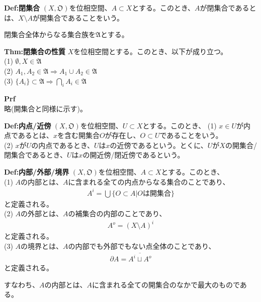 \documentclass[a4paper,11pt]{jsarticle}
\numberwithin{equation}{section}
\begin{document}
\begin{itembox}[l]{\textbf{Def:閉集合}}
  $(X,\mathfrak{O})$を位相空間、$A \subset X$とする。このとき、$A$が閉集合であるとは、$X \setminus A$が開集合であることをいう。
\end{itembox}

閉集合全体からなる集合族を$\mathfrak{A}$とする。
\begin{itembox}[l]{\textbf{Thm:閉集合の性質}}
  $X$を位相空間とする。このとき、以下が成り立つ。\\
  (1) $\emptyset, X \in \mathfrak{A}$\\
  (2) $A_1,A_2 \in \mathfrak{A} \Rightarrow A_1 \cup A_2 \in \mathfrak{A}$\\
  (3) $\{A_i\} \subset \mathfrak{A} \Rightarrow \bigcap_{i} A_i \in \mathfrak{A}$
\end{itembox}
\textbf{Prf}\\
略(開集合と同様に示す)。\hfill\qedsymbol\\

\begin{itembox}[l]{\textbf{Def:内点/近傍}}
  $(X,\mathfrak{O})$を位相空間、$U \subset X$とする。このとき、
  (1) $x \in U$が内点であるとは、$x$を含む開集合$O$が存在し、$O \subset U$であることをいう。\\
  (2) $x$が$U$の内点であるとき、$U$は$x$の近傍であるという。とくに、$U$が$X$の開集合/閉集合であるとき、$U$は$x$の開近傍/閉近傍であるという。
\end{itembox}

\begin{itembox}[l]{\textbf{Def:内部/外部/境界}}
  $(X,\mathfrak{O})$を位相空間、$A \subset X$とする。このとき、\\
  (1) $A$の内部とは、$A$に含まれる全ての内点からなる集合のことであり、
  \begin{align}
    A^{i} = \bigcup \{O \subset A | O \text{は開集合}\}
  \end{align}
  と定義される。\\
  (2) $A$の外部とは、$A$の補集合の内部のことであり、
  \begin{align}
    A^{o} = (X \setminus A)^{i}
  \end{align}
  と定義される。\\
  (3) $A$の境界とは、$A$の内部でも外部でもない点全体のことであり、
  \begin{align}
    \partial A = \overline{A^{i} \sqcup A^{o}}
  \end{align}
  と定義される。 
\end{itembox}
すなわち、$A$の内部とは、$A$に含まれる全ての開集合のなかで最大のものである。\\
\end{document}
